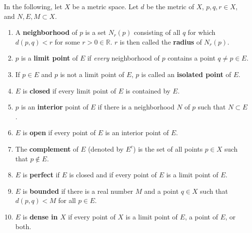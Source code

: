 \documentclass[12pt]{article}
\begin{document}
\begin{defn}
  In the following, let $X$ be a metric space. Let $d$ be the metric of $X$, $p,q,r
  \in X$, and $N,E,M \subset X$.
  \begin{enumerate}
    \item
      A \textbf{neighborhood} of $p$ is a set $N_r(p)$ consisting of all $q$ for
      which $d(p,q) < r$ for some $r > 0 \in \mathbb{R}$. $r$ is then called the
      \textbf{radius} of $N_r(p)$.
    \item
      $p$ is a \textbf{limit point} of $E$ if \textit{every} neighborhood of $p$
      contains a point $q \neq p \in E$.
    \item
      If $p \in E$ and $p$ is not a limit point of $E$, $p$ is called an
      \textbf{isolated point} of $E$.
    \item
      $E$ is \textbf{closed} if every limit point of $E$ is contained by $E$.
    \item
      $p$ is an \textbf{interior} point of $E$ if there is a neighborhood $N$ of $p$
      such that $N \subset E$.
    \item
      $E$ is \textbf{open} if every point of $E$ is an interior point of $E$.
    \item
      The \textbf{complement} of $E$ (denoted by $E^c$) is the set of all points $p
      \in X$ such that $p \notin E$.
    \item
      $E$ is \textbf{perfect} if $E$ is closed and if every point of $E$ is a limit
      point of $E$.
    \item
      $E$ is \textbf{bounded} if there is a real number $M$ and a point $q \in X$
      such that $d(p,q) < M$ for all $p \in E$.
    \item
      $E$ is \textbf{dense in $X$} if every point of $X$ is a limit point of $E$, a
      point of $E$, or both.
  \end{enumerate}
\end{defn}
\end{document}
